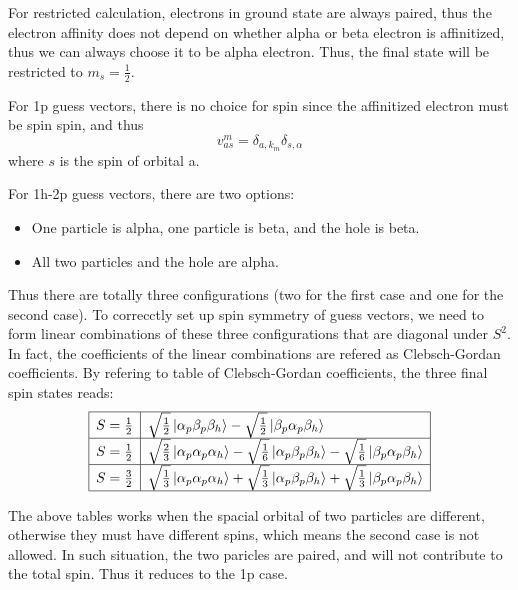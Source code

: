 \documentclass[bachelor, english]{ustcthesis}
\begin{document}
For restricted calculation, electrons in ground state are always paired, thus the electron affinity does not depend on whether alpha or beta electron is affinitized, thus we can always choose it to be alpha electron.
Thus, the final state will be restricted to $m_s=\frac{1}{2}$.

For 1p guess vectors, there is no choice for spin since the affinitized electron must be spin spin, and thus
\begin{equation}
	v^m_{a s}=\delta_{a, k_m} \delta_{s, \alpha}
\end{equation}
where $s$ is the spin of orbital a.

For 1h-2p guess vectors, there are two options:
\begin{itemize}
	\item One particle is alpha, one particle is beta, and the hole is beta.
	\item All two particles and the hole are alpha.
\end{itemize}

Thus there are totally three configurations (two for the first case and one for the second case).
To correcctly set up spin symmetry of guess vectors, we need to form linear combinations of these three configurations that are diagonal under $S^2$.
In fact, the coefficients of the linear combinations are refered as Clebsch-Gordan coefficients.
By refering to table of Clebsch-Gordan coefficients, the three final spin states reads:
\begin{equation}
	\begin{array}{|l|l|}
		\hline
		S=\frac{1}{2} & \sqrt{\frac{1}{2}} \ket{\alpha_p \beta_p \beta_h} - \sqrt{\frac{1}{2}} \ket{\beta_p \alpha_p \beta_h}
		\\
		\hline
		S=\frac{1}{2} & \sqrt{\frac{2}{3}} \ket{\alpha_p \alpha_p \alpha_h} - \sqrt{\frac{1}{6}} \ket{\alpha_p \beta_p \beta_h} - \sqrt{\frac{1}{6}} \ket{\beta_p \alpha_p \beta_h}
		\\
		\hline
		S=\frac{3}{2} & \sqrt{\frac{1}{3}} \ket{\alpha_p \alpha_p \alpha_h} + \sqrt{\frac{1}{3}} \ket{\alpha_p \beta_p \beta_h} + \sqrt{\frac{1}{3}} \ket{\beta_p \alpha_p \beta_h}
		\\
		\hline
	\end{array}
\end{equation}

The above tables works when the spacial orbital of two particles are different, otherwise they must have different spins, which means the second case is not allowed.
In such situation, the two paricles are paired, and will not contribute to the total spin.
Thus it reduces to the 1p case.
\end{document}
